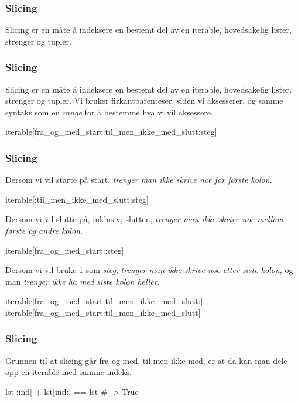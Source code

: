 \begin{frame}
    \frametitle{Slicing}

    Slicing er en måte å indeksere en bestemt del av en iterable, hovedsakelig lister, strenger og tupler.

\end{frame}

\begin{frame}[fragile]
    \frametitle{Slicing}

    Slicing er en måte å indeksere en bestemt del av en iterable, hovedsakelig lister, strenger og tupler. Vi bruker firkantparenteser, siden vi aksesserer, og samme syntaks som en \textit{range} for å bestemme hva vi vil aksessere.

\begin{python}
iterable[fra_og_med_start:til_men_ikke_med_slutt:steg]
\end{python}

\end{frame}

\begin{frame}[fragile]
    \frametitle{Slicing}

    Dersom vi vil starte på start, \textit{trenger man ikke skrive noe før første kolon}.

\begin{python}
iterable[:til_men_ikke_med_slutt:steg]
\end{python}

    Dersom vi vil slutte på, inklusiv, slutten, \textit{trenger man ikke skrive noe mellom første og andre kolon}. 

\begin{python}
iterable[fra_og_med_start::steg]
\end{python}

    Dersom vi vil bruke 1 som \textit{steg}, \textit{trenger man ikke skrive noe etter siste kolon}, og man \textit{trenger ikke ha med siste kolon heller}. 

\begin{python}
iterable[fra_og_med_start:til_men_ikke_med_slutt:]
iterable[fra_og_med_start:til_men_ikke_med_slutt]
\end{python}

\end{frame}

\begin{frame}[fragile]
    \frametitle{Slicing}

    Grunnen til at slicing går fra og med, til men ikke med, er at da kan man dele opp en iterable med samme indeks. 

\begin{python}
lst[:ind] + lst[ind:] == lst # -> True
\end{python}

\end{frame}

